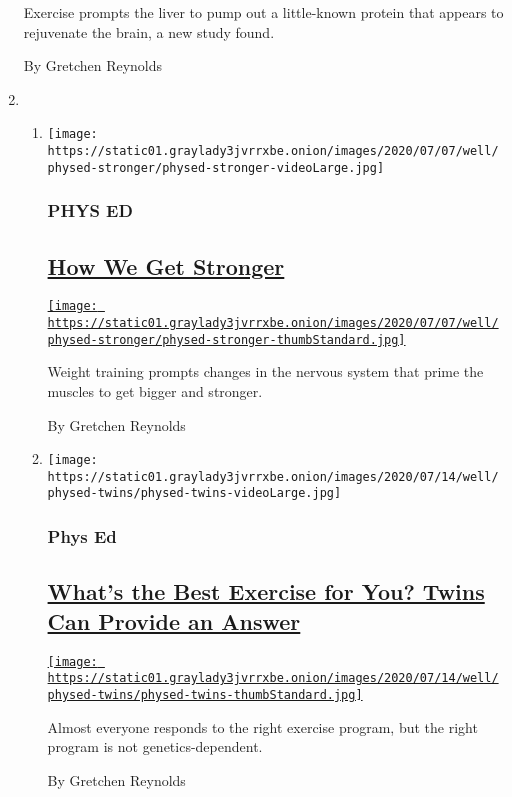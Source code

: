 \begin{enumerate}
  Exercise prompts the liver to pump out a little-known protein that
  appears to rejuvenate the brain, a new study found.

  By Gretchen Reynolds
\item
  \begin{enumerate}
  \def\labelenumii{\arabic{enumii}.}
  \item
    \texttt{[image: https://static01.graylady3jvrrxbe.onion/images/2020/07/07/well/physed-stronger/physed-stronger-videoLarge.jpg]}

    \hypertarget{phys-ed-2}{%
    \subsubsection{PHYS ED}\label{phys-ed-2}}

    \hypertarget{how-we-get-stronger}{%
    \subsection{\texorpdfstring{\href{/2020/07/01/well/move/how-we-get-stronger.html}{How
    We Get Stronger}}{How We Get Stronger}}\label{how-we-get-stronger}}

    \href{/2020/07/01/well/move/how-we-get-stronger.html}{\texttt{[image: https://static01.graylady3jvrrxbe.onion/images/2020/07/07/well/physed-stronger/physed-stronger-thumbStandard.jpg]}}

    Weight training prompts changes in the nervous system that prime the
    muscles to get bigger and stronger.

    By Gretchen Reynolds
  \item
    \texttt{[image: https://static01.graylady3jvrrxbe.onion/images/2020/07/14/well/physed-twins/physed-twins-videoLarge.jpg]}

    \hypertarget{phys-ed-3}{%
    \subsubsection{Phys Ed}\label{phys-ed-3}}

    \hypertarget{whats-the-best-exercise-for-you-twins-can-provide-an-answer}{%
    \subsection{\texorpdfstring{\href{/2020/07/08/well/move/best-exercise-strength-fitness-twins.html}{What's
    the Best Exercise for You? Twins Can Provide an
    Answer}}{What's the Best Exercise for You? Twins Can Provide an Answer}}\label{whats-the-best-exercise-for-you-twins-can-provide-an-answer}}

    \href{/2020/07/08/well/move/best-exercise-strength-fitness-twins.html}{\texttt{[image: https://static01.graylady3jvrrxbe.onion/images/2020/07/14/well/physed-twins/physed-twins-thumbStandard.jpg]}}

    Almost everyone responds to the right exercise program, but the
    right program is not genetics-dependent.

    By Gretchen Reynolds
  \end{enumerate}
\end{enumerate}

